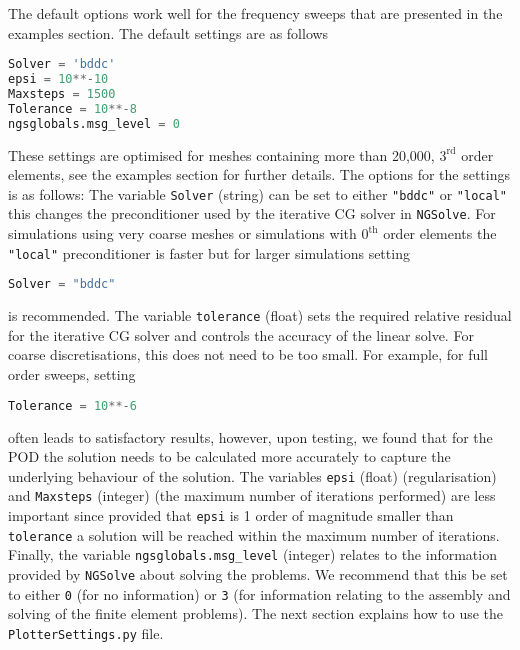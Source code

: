 \noindent
The default options work well for the frequency sweeps that are presented in the examples section. The default settings are as follows
\begin{lstlisting}[language=Python]
Solver = 'bddc'
epsi = 10**-10
Maxsteps = 1500
Tolerance = 10**-8
ngsglobals.msg_level = 0
\end{lstlisting}
These settings are optimised for meshes containing more than 20,000, $3^{\textrm{rd}}$ order elements, see the examples section for further details. The options for the settings is as follows: The variable \texttt{Solver} (string) can be set to either \texttt{"bddc"} or \texttt{"local"} this changes the preconditioner used by the iterative CG solver in \texttt{NGSolve}. For simulations using very coarse meshes or simulations with $0^{\textrm{th}}$ order elements the \texttt{"local"} preconditioner is faster but for larger simulations setting
\begin{lstlisting}[language=Python]
Solver = "bddc"
\end{lstlisting}
is recommended. The variable \texttt{tolerance} (float) sets the required relative residual for the iterative CG solver and controls the accuracy of the linear solve. For coarse discretisations, this does not need to be too small. For example, for  full order sweeps, setting
\begin{lstlisting}[language=Python]
Tolerance = 10**-6
\end{lstlisting}
often leads to satisfactory results, however, upon testing, we found that for the POD the solution needs to be calculated more accurately to capture the underlying behaviour of the solution. The variables \texttt{epsi} (float) (regularisation) and \texttt{Maxsteps} (integer) (the maximum number of iterations performed) are less important since provided that \texttt{epsi} is 1 order of magnitude smaller than \texttt{tolerance} a solution will be reached within the maximum number of iterations. Finally, the variable \texttt{ngsglobals.msg\_level} (integer) relates to the information provided by \texttt{NGSolve} about solving the problems. We recommend that this be set to either \texttt{0} (for no information) or \texttt{3} (for information relating to the assembly and solving of the finite element problems). The next section explains how to use the \texttt{PlotterSettings.py} file.\\
